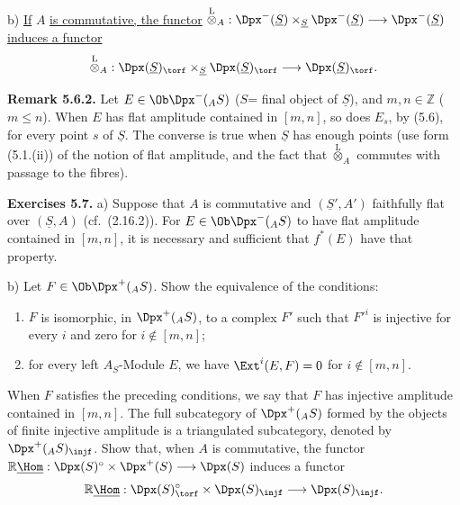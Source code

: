 b) \uline{If} \(A\) \uline{is commutative, the functor} \(\overset{\mathrm L}{\otimes}_A:\Dpx^-(\underline{S})\times_{\underline{S}}\Dpx^-(\underline{S})\longrightarrow \Dpx^-(\underline{S})\) \uline{induces a functor}
\[
  \overset{\mathrm L}{\otimes}_A:
  \Dpx(\underline{S})_{\torf}\times_{\underline{S}}\Dpx(\underline{S})_{\torf}
  \longrightarrow \Dpx(\underline{S})_{\torf}.
\]

\textbf{Remark 5.6.2.} Let \(E\in\Ob\Dpx^-({}_A S)\) (\(S\)= final object of \(\underline{S}\)), and \(m,n\in\mathbb Z\) (\(m\leq n\)). When \(E\) has flat amplitude contained in \([m,n]\), so does \(E_s\), by (5.6), for every point \(s\) of \(\underline{S}\). The converse is true when \(\underline{S}\) has enough points (use form (5.1.(ii)) of the notion of flat
%
amplitude, and the fact that \(\overset{\mathrm L}{\otimes}_A\) commutes with passage to the fibres).

\textbf{Exercises 5.7.} a) Suppose that \(A\) is commutative and \((\underline{S}',A')\) faithfully flat over \((\underline{S},A)\) (cf.\ (2.16.2)). For \(E\in\Ob\Dpx^-({}_A S)\) to have flat amplitude contained in \([m,n]\), it is necessary and sufficient that \(f^*(E)\) have that property.

b) Let \(F\in\Ob\Dpx^+({}_A S)\). Show the equivalence of the conditions:
\begin{enumerate}[label=(\roman*)]
\item \(F\) is isomorphic, in \(\Dpx^+({}_A S)\), to a complex \(F'\) such that \(F'^i\) is injective for every \(i\) and zero for \(i\notin[m,n]\);
\item for every left \(A_S\)-Module \(E\), we have \(\Ext^i(E,F)=0\) for \(i\notin[m,n]\).
\end{enumerate}
When \(F\) satisfies the preceding conditions, we say that \(F\) has injective amplitude contained in \([m,n]\). The full subcategory of \(\Dpx^+({}_A S)\) formed by the objects of finite injective amplitude is a triangulated subcategory, denoted by \(\Dpx^+({}_A S)_{\injf}\). Show that, when \(A\) is commutative, the functor \(\mathbb R\underline{\Hom}:\Dpx(S)^\circ\times\Dpx^+(S)\longrightarrow \Dpx(S)\) induces a functor
\[
  \mathbb R\underline{\Hom}:\Dpx(S)^\circ_{\torf}\times\Dpx(S)_{\injf}
  \longrightarrow \Dpx(S)_{\injf}.
\]

